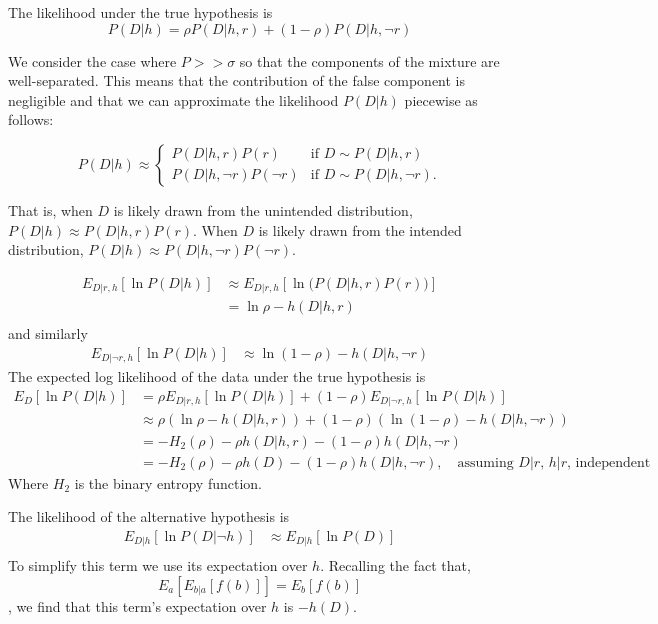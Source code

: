The likelihood under the true hypothesis is
$$P(D | h) = \rho P(D | h, r) + (1 - \rho) P(D | h, \neg r)$$

We consider the case where $P > > \sigma$
so that the components of the mixture are well-separated.
This means that the contribution of the false component is negligible
and that we can approximate the likelihood $P(D|h)$ piecewise as follows:

\[
P(D|h) \approx 
\begin{cases}
P(D | h, r) P(r) & \text{if } D \sim P(D|h, r) \\
P(D | h, \neg r)P(\neg r) & \text{if } D \sim P(D|h, \neg r).
\end{cases}
\]

That is, when $D$ is likely drawn from the unintended distribution, $P(D|h) \approx P(D|h, r) P(r)$. When $D$ is likely drawn from the intended distribution, $P(D|h) \approx P(D|h, \neg r)P(\neg r)$.




\begin{align*}
E_{D | r, h} \left[ \ln P(D | h) \right] &\approx E_{D | r, h} \left[ \ln \Big( P(D | h, r) P(r) \Big) \right] \\
&= \ln \rho - h(D | h, r) \\
\end{align*}
and similarly
\begin{align*}
E_{D | \neg r, h} \left[ \ln P(D | h) \right] &\approx \ln (1 - \rho) - h(D | h, \neg r)
\end{align*}
The expected log likelihood of the data under the true hypothesis is
\begin{align*}
E_D \left[ \ln P(D | h) \right] &= \rho E_{D | r, h} \left[ \ln P(D | h) \right] + (1 - \rho) E_{D | \neg r, h} \left[ \ln P(D | h) \right] \\
&\approx \rho (\ln \rho - h(D | h, r)) + (1 - \rho) (\ln (1 - \rho) - h(D | h, \neg r)) \\
&= - H_2(\rho) - \rho h(D | h, r) - (1 - \rho) h(D | h, \neg r) \\
&= - H_2(\rho) - \rho h(D) - (1 - \rho) h(D | h, \neg r), \quad \text{assuming $D|r$, $h|r$, independent}
\end{align*}
Where $H_2$ is the binary entropy function.

The likelihood of the alternative hypothesis is
\begin{align*}
E_{D | h}\left[ \ln P(D | \neg h) \right] &\approx E_{D | h} \left[ \ln P(D) \right] \\
\end{align*}
To simplify this term we use its expectation over $h$.
Recalling the fact that,
$$ E_a \left[ E_{b | a} [f(b)] \right] = E_b [f(b)] $$,
we find that this term's expectation over $h$ is $-h(D)$.

